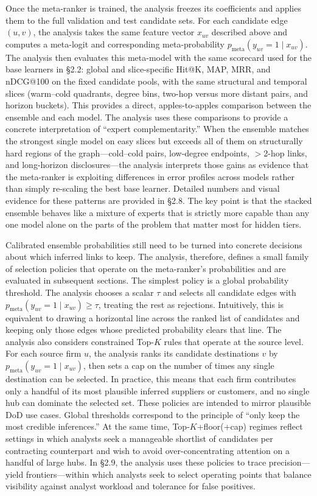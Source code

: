 Once the meta-ranker is trained, the analysis freezes its coefficients and applies them to the full validation and test candidate sets. For each candidate edge \((u,v)\), the analysis takes the same feature vector \(x_{uv}\) described above and computes a meta-logit and corresponding meta-probability \(p_{\text{meta}}(y_{uv}=1 \mid x_{uv})\). The analysis then evaluates this meta-model with the same scorecard used for the base learners in \S2.2: global and slice-specific Hit@K, MAP, MRR, and nDCG@100 on the fixed candidate pools, with the same structural and temporal slices (warm--cold quadrants, degree bins, two-hop versus more distant pairs, and horizon buckets). This provides a direct, apples-to-apples comparison between the ensemble and each model. The analysis uses these comparisons to provide a concrete interpretation of ``expert complementarity.'' When the ensemble matches the strongest single model on easy slices but exceeds all of them on structurally hard regions of the graph---cold--cold pairs, low-degree endpoints, \(>\)2-hop links, and long-horizon disclosures---the analysis interprets those gains as evidence that the meta-ranker is exploiting differences in error profiles across models rather than simply re-scaling the best base learner. Detailed numbers and visual evidence for these patterns are provided in \S2.8. The key point is that the stacked ensemble behaves like a mixture of experts that is strictly more capable than any one model alone on the parts of the problem that matter most for hidden tiers.

Calibrated ensemble probabilities still need to be turned into concrete decisions about which inferred links to keep. The analysis, therefore, defines a small family of selection policies that operate on the meta-ranker's probabilities and are evaluated in subsequent sections. The simplest policy is a global probability threshold. The analysis chooses a scalar \(\tau\) and selects all candidate edges with \(p_{\text{meta}}(y_{uv}=1 \mid x_{uv}) \ge \tau\), treating the rest as rejections. Intuitively, this is equivalent to drawing a horizontal line across the ranked list of candidates and keeping only those edges whose predicted probability clears that line. The analysis also considers constrained Top-\(K\) rules that operate at the source level. For each source firm \(u\), the analysis ranks its candidate destinations \(v\) by \(p_{\text{meta}}(y_{uv}=1 \mid x_{uv})\), then sets a cap on the number of times any single destination can be selected. In practice, this means that each firm contributes only a handful of its most plausible inferred suppliers or customers, and no single hub can dominate the selected set. These policies are intended to mirror plausible DoD use cases. Global thresholds correspond to the principle of ``only keep the most credible inferences.'' At the same time, Top-\(K\)+floor(+cap) regimes reflect settings in which analysts seek a manageable shortlist of candidates per contracting counterpart and wish to avoid over-concentrating attention on a handful of large hubs. In \S2.9, the analysis uses these policies to trace precision---yield frontiers---within which analysts seek to select operating points that balance visibility against analyst workload and tolerance for false positives.

